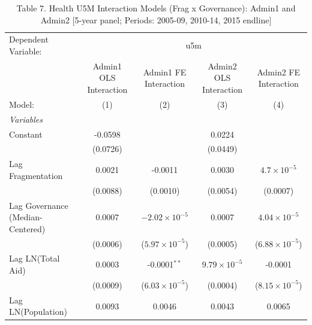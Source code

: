 
\begin{table}[H]
   \caption{Table 7. Health U5M Interaction Models (Frag x Governance): Admin1 and Admin2 [5-year panel; Periods: 2005-09, 2010-14, 2015 endline]}
   \centering
   \begin{tabular}{lcccc}
      \tabularnewline \midrule \midrule
      Dependent Variable: & \multicolumn{4}{c}{u5m}\\
                                                           & Admin1 OLS Interaction & Admin1 FE Interaction   & Admin2 OLS Interaction & Admin2 FE Interaction \\   
      Model:                                               & (1)                    & (2)                     & (3)                    & (4)\\  
      \midrule
      \emph{Variables}\\
      Constant                                             & -0.0598                &                         & 0.0224                 &   \\   
                                                           & (0.0726)               &                         & (0.0449)               &   \\   
      Lag Fragmentation                                    & 0.0021                 & -0.0011                 & 0.0030                 & $4.7\times 10^{-5}$\\    
                                                           & (0.0088)               & (0.0010)                & (0.0054)               & (0.0007)\\   
      Lag Governance (Median-Centered)                     & 0.0007                 & $-2.02\times 10^{-5}$   & 0.0007                 & $4.04\times 10^{-5}$\\    
                                                           & (0.0006)               & ($5.97\times 10^{-5}$)  & (0.0005)               & ($6.88\times 10^{-5}$)\\    
      Lag LN(Total Aid)                                    & 0.0003                 & -0.0001$^{**}$          & $9.79\times 10^{-5}$   & -0.0001\\   
                                                           & (0.0009)               & ($6.03\times 10^{-5}$)  & (0.0004)               & ($8.15\times 10^{-5}$)\\    
      Lag LN(Population)                                   & 0.0093                 & 0.0046                  & 0.0043                 & 0.0065\\   

\end{tabular}
\end{table}
